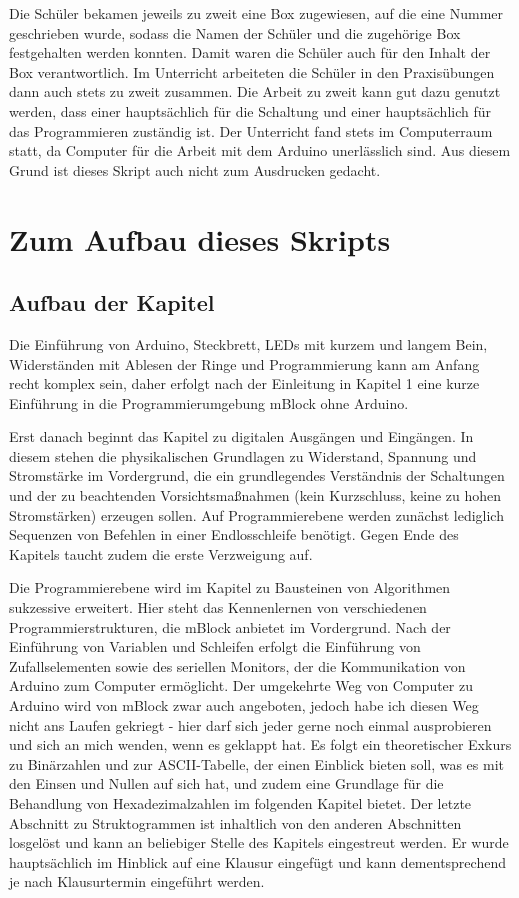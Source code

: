 Die Schüler bekamen jeweils zu zweit eine Box zugewiesen, auf die eine Nummer geschrieben wurde, sodass die Namen der Schüler und die zugehörige Box festgehalten werden konnten. Damit waren die Schüler auch für den Inhalt der Box verantwortlich. Im Unterricht arbeiteten die Schüler in den Praxisübungen dann auch stets zu zweit zusammen. Die Arbeit zu zweit kann gut dazu genutzt werden, dass einer hauptsächlich für die Schaltung und einer hauptsächlich für das Programmieren zuständig ist. Der Unterricht fand stets im Computerraum statt, da Computer für die Arbeit mit dem Arduino unerlässlich sind. Aus diesem Grund ist dieses Skript auch nicht zum Ausdrucken gedacht.

\section{Zum Aufbau dieses Skripts}

\subsection{Aufbau der Kapitel}

Die Einführung von Arduino, Steckbrett, LEDs mit kurzem und langem Bein, Widerständen mit Ablesen der Ringe und Programmierung kann am Anfang recht komplex sein, daher erfolgt nach der Einleitung in Kapitel 1 eine kurze Einführung in die Programmierumgebung mBlock ohne Arduino.

Erst danach beginnt das Kapitel zu digitalen Ausgängen und Eingängen. In diesem stehen die physikalischen Grundlagen zu Widerstand, Spannung und Stromstärke im Vordergrund, die ein grundlegendes Verständnis der Schaltungen und der zu beachtenden Vorsichtsmaßnahmen (kein Kurzschluss, keine zu hohen Stromstärken) erzeugen sollen. Auf Programmierebene werden zunächst lediglich Sequenzen von Befehlen in einer Endlosschleife benötigt. Gegen Ende des Kapitels taucht zudem die erste Verzweigung auf.

Die Programmierebene wird im Kapitel zu Bausteinen von Algorithmen sukzessive erweitert. Hier steht das Kennenlernen von verschiedenen Programmierstrukturen, die mBlock anbietet im Vordergrund. Nach der Einführung von Variablen und Schleifen erfolgt die Einführung von Zufallselementen sowie des seriellen Monitors, der die Kommunikation von Arduino zum Computer ermöglicht. Der umgekehrte Weg von Computer zu Arduino wird von mBlock zwar auch angeboten, jedoch habe ich diesen Weg nicht ans Laufen gekriegt - hier darf sich jeder gerne noch einmal ausprobieren und sich an mich wenden, wenn es geklappt hat. Es folgt ein theoretischer Exkurs zu Binärzahlen und zur ASCII-Tabelle, der einen Einblick bieten soll, was es mit den Einsen und Nullen auf sich hat, und zudem eine Grundlage für die Behandlung von Hexadezimalzahlen im folgenden Kapitel bietet. Der letzte Abschnitt zu Struktogrammen ist inhaltlich von den anderen Abschnitten losgelöst und kann an beliebiger Stelle des Kapitels eingestreut werden. Er wurde hauptsächlich im Hinblick auf eine Klausur eingefügt und kann dementsprechend je nach Klausurtermin eingeführt werden.


